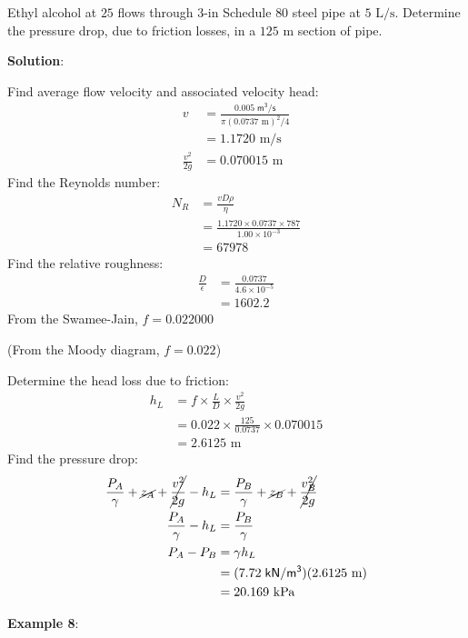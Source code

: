 \documentclass[10pt]{amsart}
\begin{document}
	Ethyl alcohol at $25$\textcelsius{} flows through $3\text{-in}$ Schedule $80$ steel pipe at
	$5\text{ L/s}$. Determine the pressure drop, due to friction losses, in a $125\text{ m}$ section of pipe.

	\textbf{Solution}:
	
	Find average flow velocity and associated velocity head:
	\begin{align*}
		v &= \frac{0.005\;\mathsf{m^3/s}}{\pi(0.0737\text{ m})^2/4}\\
		&= 1.1720\text{ m/s}\\
		\frac{v^2}{2g} &= 0.070015\text{ m}
	\end{align*}
	Find the Reynolds number:
	\begin{align*}
		N_R &= \frac{vD\rho}{\eta}\\
		&= \frac{1.1720\times 0.0737\times 787}{1.00\times10^{-3}}\\
		&= 67978
	\end{align*}
	Find the relative roughness:
	\begin{align*}
		\frac{D}{\epsilon} &= \frac{0.0737}{4.6\times10^{-5}}\\
		&= 1602.2
	\end{align*}
	From the Swamee-Jain, $f=0.022000$
	
	(From the Moody diagram, $f=0.022$)
	
	Determine the head loss due to friction:
	\begin{align*}
		h_L &= f\times\frac{L}{D}\times\frac{v^2}{2g}\\
		&= 0.022\times\frac{125}{0.0737}\times0.070015\\
		&= 2.6125\text{ m}
	\end{align*}
	Find the pressure drop:
	\begin{align*}
		\frac{P_A}{\gamma}+ \cancel{z_A} + \cancel{\frac{v^2}{2g}}-h_L &= \frac{P_B}{\gamma}+\cancel{z_B}+\cancel{\frac{v_B^2}{2g}}\\ 
		\frac{P_A}{\gamma}-h_L &= \frac{P_B}{\gamma}\\ 
		P_A-P_B &= \gamma h_L\\
		&= (7.72\;\mathsf{kN/m^3})(2.6125\text{ m})	\\
		&= 20.169\text{ kPa}	
	\end{align*}
	
	\vfill\newpage
	
	\textbf{Example 8}:
	
\end{document}
